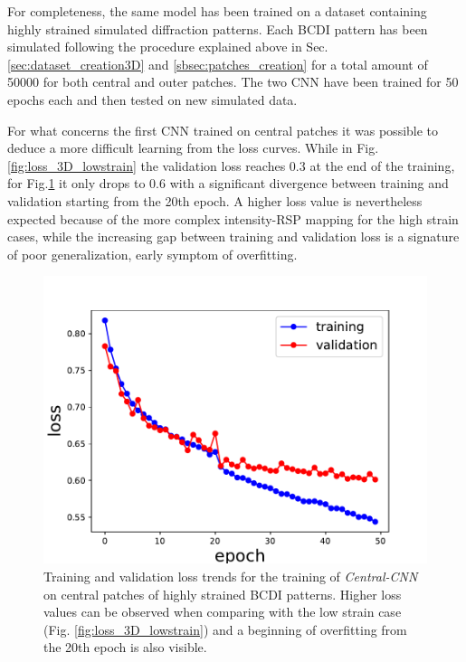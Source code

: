 For completeness, the same model has been trained on a dataset containing highly strained simulated diffraction patterns. 
Each BCDI pattern has been simulated following the procedure explained above in Sec. \ref{sec:dataset_creation3D} and
 \ref{sbsec:patches_creation} for a total amount of 50000 for both central and outer patches. The two CNN have been trained 
 for 50 epochs each and then tested on new simulated data. 

 For what concerns the first CNN trained on central patches it was possible to deduce a more difficult learning from the 
 loss curves. While in Fig.\ref{fig:loss_3D_lowstrain} the validation loss reaches 0.3 at the end of the training, for 
Fig.\ref{fig:loss_central_highstrain} it only drops to 0.6 with a significant divergence between training and validation 
starting from the 20th epoch. A higher loss value is nevertheless expected because of the more complex intensity-RSP mapping 
for the high strain cases, while the increasing gap between training and validation loss is a signature of poor generalization, 
early symptom of overfitting. 

\begin{figure}[H]
    \centering
    \includegraphics[width=\textwidth]{figures/Phasing/loss_central_patch_highstrain.pdf}
    \caption{Training and validation loss trends for the training of \textit{Central-CNN} on central patches of highly strained BCDI 
    patterns. Higher loss values can be observed when comparing with the low strain case (Fig. \ref{fig:loss_3D_lowstrain}) and a 
    beginning of overfitting from the 20th epoch is also visible. }
    \label{fig:loss_central_highstrain}
\end{figure}

